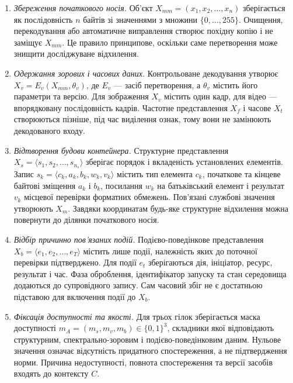 \begin{enumerate}
\item \textit{Збереження початкового носія.} Об’єкт $X_{mm}=(x_1,x_2,\ldots,x_n)$ зберігається як послідовність $n$ байтів зі значеннями з множини $\{0,\ldots,255\}$. Очищення, перекодування або автоматичне виправлення створює похідну копію і не заміщує $X_{mm}$. Це правило принципове, оскільки саме перетворення може знищити досліджуване відхилення.

\item \textit{Одержання зорових і часових даних.} Контрольоване декодування утворює $X_v=E_v(X_{mm},\theta_v)$, де $E_v$ --- засіб перетворення, а $\theta_v$ містить його параметри та версію. Для зображення $X_v$ містить один кадр, для відео --- впорядковану послідовність кадрів. Частотне представлення $X_f$ і часове $X_t$ створюються пізніше, під час виділення ознак, тому вони не замінюють декодованого входу.

\item \textit{Відтворення будови контейнера.} Структурне представлення $X_s=\langle s_1,s_2,\ldots,s_{n_s}\rangle$ зберігає порядок і вкладеність установлених елементів. Запис $s_k=\langle c_k,a_k,b_k,w_k,v_k\rangle$ містить тип елемента $c_k$, початкове та кінцеве байтові зміщення $a_k$ і $b_k$, посилання $w_k$ на батьківський елемент і результат $v_k$ місцевої перевірки форматних обмежень. Пов’язані службові значення утворюють $X_m$. Завдяки координатам будь-яке структурне відхилення можна повернути до ділянки початкового носія.

\item \textit{Відбір причинно пов’язаних подій.} Подієво-поведінкове представлення $X_b=\langle e_1,e_2,\ldots,e_T\rangle$ містить лише події, належність яких до поточної перевірки підтверджено. Для події $e_t$ зберігаються дія, ініціатор, ресурс, результат і час. Фаза оброблення, ідентифікатор запуску та стан середовища додаються до супровідного запису. Сам часовий збіг не є достатньою підставою для включення події до $X_b$.

\item \textit{Фіксація доступності та якості.} Для трьох гілок зберігається маска доступності $m_A=(m_s,m_v,m_b)\in\{0,1\}^3$, складники якої відповідають структурним, спектрально-зоровим і подієво-поведінковим даним. Нульове значення означає відсутність придатного спостереження, а не підтвердження норми. Причина недоступності, повнота спостереження та версії засобів входять до контексту $C$.
\end{enumerate}

